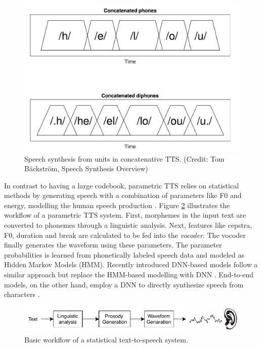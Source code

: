 \begin{figure}[t]
  \centering
  \includegraphics[width=0.7\linewidth]{img/concatenative_tts.png}
  \caption[Speech synthesis from units in concatenative TTS.]{Speech synthesis from units in concatenative TTS. (Credit: Tom Bäckström, Speech Synthesis Overview\protect\footnotemark)}
  \label{sota:figure:concatenative_tts}
\end{figure}


In contrast to having a large codebook, parametric TTS relies on statistical methods by generating speech with a combination of parameters like F0 and energy, modelling the human speech production \citep{Zen:2009:RSP:1576860.1577027}. Figure \ref{sota:figure:tts} illustrates the workflow of a parametric TTS system. First, morphemes in the input text are converted to phonemes through a linguistic analysis. Next, features like cepstra, F0, duration and break are calculated to be fed into the \textit{vocoder}. The vocoder finally generates the waveform using these parameters. The parameter probabilities is learned from phonetically labeled speech data and modeled as Hidden Markov Models (HMM). Recently introduced DNN-based models follow a similar approach but replace the HMM-based modelling with DNN \citep{zen_dnn}. End-to-end models, on the other hand, employ a DNN to directly synthesize speech from characters \cite{Wang2017}.

\begin{figure}[t]
  \centering
  \includegraphics[width=0.9\linewidth]{img/tts_diagram.pdf}
  \caption{Basic workflow of a statistical text-to-speech system.}
  \label{sota:figure:tts}
\end{figure}

